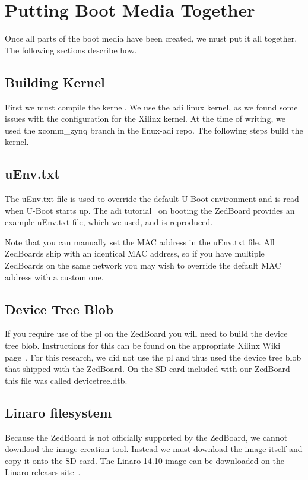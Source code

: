 \documentclass[thesis.tex]{subfile}
\begin{document}
\section{Putting Boot Media Together}
Once all parts of the boot media have been created, we must put it all together. The following sections describe how.


\subsection{Building Kernel}
First we must compile the kernel. We use the \gls{adi} linux kernel, as we found some issues with the configuration for the Xilinx kernel. At the time of writing, we used the xcomm\_zynq branch in the linux-adi repo. The following steps build the kernel.


\subsection{uEnv.txt} \label{subsec:uenv}
The uEnv.txt file is used to override the default U-Boot environment and is read when U-Boot starts up. The \gls{adi} tutorial~\cite{uenv} on booting the ZedBoard provides an example uEnv.txt file, which we used, and is reproduced.

Note that you can manually set the MAC address in the uEnv.txt file. All ZedBoards ship with an identical MAC address, so if you have multiple ZedBoards on the same network you may wish to override the default MAC address with a custom one.

\subsection{Device Tree Blob}
If you require use of the \gls{pl} on the ZedBoard you will need to build the device tree blob. Instructions for this can be found on the appropriate Xilinx Wiki page~\cite{devicetree}. For this research, we did not use the \gls{pl} and thus used the device tree blob that shipped with the ZedBoard. On the SD card included with our ZedBoard this file was called devicetree.dtb.

\subsection{Linaro filesystem}
Because the ZedBoard is not officially supported by the ZedBoard, we cannot download the image creation tool. Instead we must download the image itself and copy it onto the SD card. The Linaro 14.10 image can be downloaded on the Linaro releases site~\cite{linaroImage}.
\end{document}
